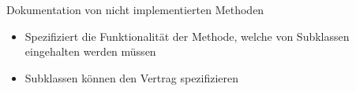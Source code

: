 \documentclass{../tuda-beamer}
\begin{document}
  \begin{frame}{Dokumentation von nicht implementierten Methoden}
    \begin{itemize}
      \item Spezifiziert die Funktionalität der Methode, welche von Subklassen eingehalten werden
      müssen
      \item Subklassen können den Vertrag spezifizieren
    \end{itemize}

    
  \end{frame}

  \begin{frame}[allowframebreaks, c]
    
  \end{frame}

  \begin{frame}[c]
    
  \end{frame}

  \begin{frame}[allowframebreaks, c]
    
  \end{frame}

  \begin{frame}[allowframebreaks, c]
    
  \end{frame}

  \begin{frame}[allowframebreaks, c]
    
  \end{frame}

  \begin{frame}[allowframebreaks, c]
    
  \end{frame}
\end{document}

